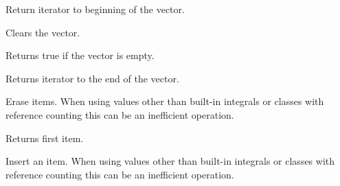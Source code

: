 

Return iterator to beginning of the vector.

\label{wxvectorcapacity}



\label{wxvectorclear}


Clears the vector.

\label{wxvectorempty}


Returns true if the vector is empty.

\label{wxvectorend}



Returns iterator to the end of the vector.

\label{wxvectorerase}



Erase items. When using values other than built-in integrals 
or classes with reference counting this can be an inefficient
operation.

\label{wxvectorfront}



Returns first item.

\label{wxvectorinsert}


Insert an item. When using values other than built-in integrals 
or classes with reference counting this can be an inefficient
operation.

\label{wxvectoroperatorunknown}


